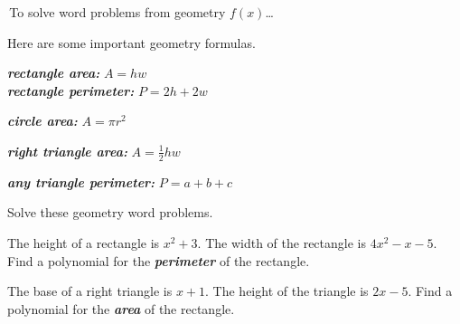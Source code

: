 

\begin{myConceptSteps}{\,To solve word problems from geometry $f(x)$\dots}
\end{myConceptSteps}

Here are some important geometry formulas.

\begin{tcbraster}[colback=white, raster columns=2, raster equal height]
    \begin{tcolorbox}
        {\large\bfseries\itshape rectangle area:} $A = hw$\\
        {\large\bfseries\itshape rectangle perimeter:} $P = 2h + 2w$
        \vspace{1.5in}
    \end{tcolorbox}
    \begin{tcolorbox}
        {\large\bfseries\itshape circle area:} $A = \pi r^2$\\
        \vspace{1.5in}
    \end{tcolorbox}
    \begin{tcolorbox}
        {\large\bfseries\itshape right triangle area:} $A = \frac{1}{2}hw$\\
        \vspace{1.5in}
    \end{tcolorbox}
    \begin{tcolorbox}
        {\large\bfseries\itshape any triangle perimeter:} $P = a + b + c$\\
        \vspace{1.5in}
    \end{tcolorbox}
\end{tcbraster}

\vspace{2em}
\begin{myProblemsWithContent}{2}{Solve these geometry word problems.}
    \begin{tcolorbox}
        The height of a rectangle is $x^2+3$.
        The width of the rectangle is $4x^2 - x - 5$.
        Find a polynomial for the {\bfseries\itshape perimeter} of the rectangle.
        \vspace{4.5in}
    \end{tcolorbox}
    \begin{tcolorbox}
        The base of a right triangle is $x+1$.
        The height of the triangle is $2x-5$.
        Find a polynomial for the {\bfseries\itshape area} of the rectangle.
    \end{tcolorbox}
\end{myProblemsWithContent}

